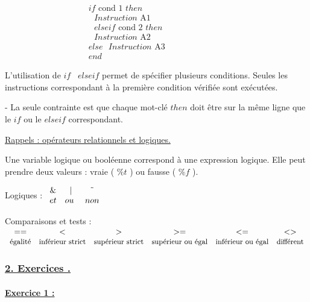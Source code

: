 \documentclass{article}
\begin{document}
$\ \ \ \ \ \ \ \ \ \ \ \ \ \ \ \ \ \ \ \ \ \ \ \ \ \ \ \ \ \ \ \ \ \ \ \ \ \
\ \ \ \ \ 
\begin{array}{c}
if\text{ cond 1 }then \\ 
\text{ \ \ \ \ \ \ \ \ \ \ \ \ \ \ \ \ \ \ \ \ \ \ \ \ \ \ \ \ }Instruction%
\text{ A1 } \\ 
\text{ \ }elseif\text{ cond 2 \ }then \\ 
\text{ \ \ \ \ \ \ \ \ \ \ \ \ \ \ \ \ \ \ \ \ \ \ \ \ }Instruction\text{ A2}
\\ 
else\text{ \ \ \ }Instruction\text{ A3} \\ 
end%
\end{array}%
$

L'utilisation de $if$ \ $elseif$ permet de sp\'{e}cifier plusieurs
conditions. Seules les instructions correspondant \`{a} la premi\`{e}re
condition v\'{e}rifi\'{e}e sont ex\'{e}cut\'{e}es.

- La seule contrainte est que chaque mot-cl\'{e} $then$ doit \^{e}tre sur la
m\^{e}me ligne que le $if$ ou le $elseif$ correspondant.

\bigskip \underline{Rappels : op\'{e}rateurs relationnels et logiques.}

Une variable logique ou bool\'{e}enne correspond \`{a} une expression
logique. Elle peut prendre deux valeurs : vraie ( $\%t$ ) ou fausse ( $\%f$
).

Logiques : $%
\begin{array}{ccc}
\& & | & \symbol{126} \\ 
et & ou\text{ } & non%
\end{array}%
$

Comparaisons et tests : $%
\begin{array}{cccccc}
== & < & > & >= & <= & <> \\ 
\text{{\small \'{e}galit\'{e}}} & \text{{\small inf\'{e}rieur strict}} & 
\text{{\small sup\'{e}rieur strict}} & \text{{\small sup\'{e}rieur ou \'{e}%
gal}} & \text{{\small inf\'{e}rieur ou \'{e}gal}} & \text{{\small diff\'{e}%
rent}}%
\end{array}%
$

\subsubsection{\protect\underline{2. Exercices .}}

\paragraph{\protect\underline{Exercice 1 :}}
\end{document}
